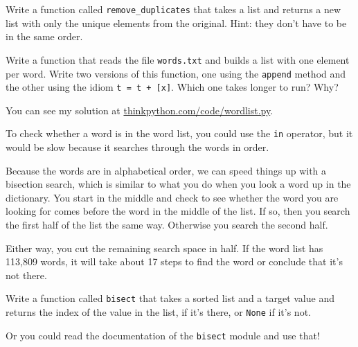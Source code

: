 \documentclass[10pt]{book}
\begin{document}
\begin{ex}


Write a function called \verb"remove_duplicates" that takes
a list and returns a new list with only the unique elements from
the original.  Hint: they don't have to be in the same order.
\end{ex}


\begin{ex}

Write a function that reads the file {\tt words.txt} and builds
a list with one element per word.  Write two versions of
this function, one using the {\tt append} method and the
other using the idiom {\tt t = t + [x]}.  Which one takes
longer to run?  Why?

You can see my solution at \url{thinkpython.com/code/wordlist.py}.
\end{ex}


\begin{ex}
\label{wordlist1}
\label{bisection}


To check whether a word is in the word list, you could use
the {\tt in} operator, but it would be slow because it searches
through the words in order.

Because the words are in alphabetical order, we can speed things up
with a bisection search, which is similar to what you do when you look
a word up in the dictionary.  You start in the middle and check to see
whether the word you are looking for comes before the word in the
middle of the list.  If so, then you search the first half of the list
the same way.  Otherwise you search the second half.

Either way, you cut the remaining search space in half.  If the
word list has 113,809 words, it will take about 17 steps to
find the word or conclude that it's not there.

Write a function called {\tt bisect} that takes a sorted list
and a target value and returns the index of the value
in the list, if it's there, or {\tt None} if it's not.


Or you could read the documentation of the {\tt bisect} module
and use that!
\end{ex}
\end{document}
